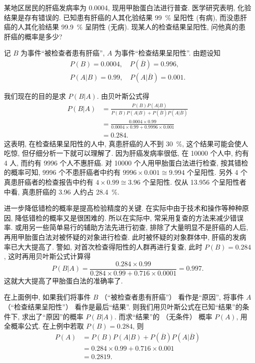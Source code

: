 \begin{example}
  某地区居民的肝癌发病率为 \num{0.0004},
  现用甲胎蛋白法进行普查.
  医学研究表明,
  化验结果是存有错误的.
  已知患有肝癌的人其化验结果 \SI{99}{\percent} 呈阳性 (有病),
  而没患肝癌的人其化验结果 \SI{99.9}{\percent} 呈阴性 (无病).
  现某人的检查结果呈阳性,
  问他真的患肝癌的概率是多少?
\end{example}

\begin{solution}
  记 $B$ 为事件“被检查者患有肝癌”,
  $A$ 为事件“检查结果呈阳性”.
  由题设知
  \begin{gather*}
    P(B) = 0.0004, \quad P(\overline{B}) = 0.996,\\
    P(A|B) = 0.99, \quad P(A|\overline{B}) = 0.001.
  \end{gather*}

  我们现在的目的是求 $P(B|A)$.
  由贝叶斯公式得
  \begin{align*}
    P(B|A) &= \frac{P(B) P(A|B)}{P(B) P(A|B) + P(\overline{B}) P(A|\overline{B})}\\
    &= \frac{0.0004 \times 0.99}{0.0004 \times 0.99 + 0.9996 \times 0.001}\\
    &= 0.284.
  \end{align*}
  这表明,
  在检查结果呈阳性的人中,
  真患肝癌的人不到 \SI{30}{\percent},
  这个结果可能会使人吃惊,
  但仔细分析一下就可以理解了.
  因为肝癌发病率很低,
  在 \num{10000} 个人中,
  约有 4 人,
  而约有 \num{9996} 个人不惠肝癌.
  对 \num{10000} 个人用甲胎蛋白法进行检查,
  按其错检的概率可知,
  \num{9996} 个不患肝癌者中约有 $9996 \times 0.001 \cong 9.994$ 个呈阳性.
  另外 4 个真患肝癌者的检查报告中约有 $4 \times 0.99 \cong 3.96 $ 个呈阳性.
  仅从 \num{13.956} 个呈阳性者中看,
  真患肝癌的 3.96 人约占 \SI{28.4}{\percent}.
\end{solution}

进一步降低错检的概率是提高检验精度的关键.
在实际中由于技术和操作等种种原因,
降低错检的概率又是很困难的.
所以在实际中,
常采用复查的方法来减少错误率.
或用另一些简单易行的辅助方法先进行初查,
排除了大量明显不是肝癌的人后,
再用甲胎蛋白法对被怀疑的对象进行检查.
此时被怀疑的对象群体中,
肝癌的发病率已大大提高了.
警如,
对首次检查得阳性的人群再进行复查,
此时 $P(B) = 0.284$,
这时再用贝叶斯公式计算得
\[
  P(B|A) = \frac{0.284 \times 0.99}{0.284 \times 0.99 + 0.716 \times 0.0001} = 0.997.
\]
这就大大提高了甲胎蛋白法的准确率了.

在上面例中,
如果我们将事件 $B$ （“被检查者患有肝癌”） 看作是“原因”,
将事件 $A$ （“检查结果呈阳性”） 看作是最后“结果”.
则我们用贝叶斯公式在已知“结果”的条件下,
求出了“原因”的概率 $P(B|A)$.
而求“结果”的 （无条件） 概率 $P(A)$,
用全概率公式.
在上例中若取 $P(B) = 0.284$,
则
\begin{align*}
  P(A) &= P(B) P(A|B) + P(\overline{B}) P(A|\overline{B})\\
  &= 0.284 \times 0.99 + 0.716 \times 0.001\\
  &= 0.2819.
\end{align*}



